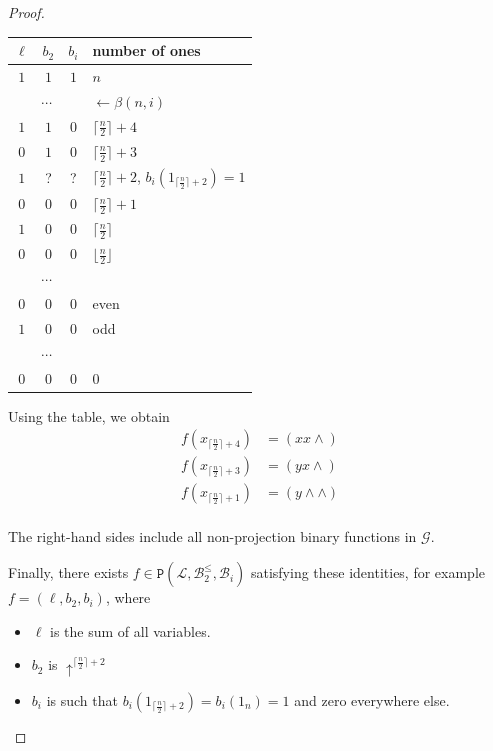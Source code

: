 \documentclass{amsart}
\numberwithin{equation}{section}
\theoremstyle{plain}
\theoremstyle{definition}
\def\clone#1{\mathcal{#1}}
\def\minion#1{\mathcal{#1}}
\def\Bc{\clone{B}}
\def\Lc{\clone{L}}
\def\atleast#1{\uparrow^{#1}}
\def\C#1{{\mathtt{P}}(#1)}
\begin{document}
\begin{proof}
\begin{center}
\begin{tabular}{ |ccc|l } 
 \hline
 $\ell$ & $b_2$ & $b_i$ & number of ones \\ 
  \hline
     $1$ & $1$ & $1$ & $n$ \\ 
\multicolumn{3}{|c|}{$\cdots$} & \color{gray}$\longleftarrow\beta(n,i)$ \\
     $1$ & $1$ & $0$  &  $\lceil\frac{n}{2}\rceil +4$ \\
     $0$ & $1$ & $0$  &  $\lceil\frac{n}{2}\rceil +3$ \\
     $1$ & ? & ?  &  $\lceil\frac{n}{2}\rceil +2$, $b_i(1_{\lceil\frac{n}{2}\rceil +2}) = 1$ \\
     $0$ & $0$ & $0$ & $\lceil\frac{n}{2}\rceil +1$ \\
     $1$ & $0$ & $0$  & $\lceil\frac{n}{2}\rceil$ \\
     $0$ & $0$ & $0$  & $\lfloor\frac{n}{2}\rfloor$ \\
\multicolumn{3}{|c|}{$\cdots$} \\
     $0$ & $0$ & $0$  & even \\
     $1$ & $0$ & $0$  & odd \\
\multicolumn{3}{|c|}{$\cdots$} \\
     $0$ & $0$ & $0$  & $0$\\
 \hline
\end{tabular}
\end{center}

Using the table, we obtain
\begin{align*}
f(x_{\lceil\frac{n}{2}\rceil +4}) &= (xx{\wedge}) \\
f(x_{\lceil\frac{n}{2}\rceil +3}) &= (yx{\wedge}) \\
f(x_{\lceil\frac{n}{2}\rceil +1}) &= (y{\wedge}{\wedge}) \\
\end{align*}

The right-hand sides include all non-projection binary functions in $\minion{G}$.

Finally, there exists $f\in\C{\Lc,\Bc_2^\leq, \Bc_i}$ satisfying these identities, for example $f=(\ell,b_2,b_i)$, where
\begin{itemize}
\item $\ell$ is the sum of all variables.
\item $b_2$ is $\atleast{\lceil\frac{n}{2}\rceil+2}$
\item $b_i$ is such that $b_i({1_{\lceil\frac{n}{2}\rceil +2}})=b_i(1_n)=1$ and zero everywhere else.
\end{itemize}
\end{proof}
\end{document}
